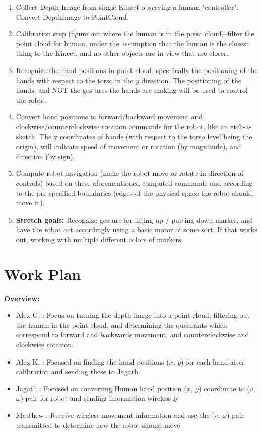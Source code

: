 \documentclass[a4paper]{article}
\begin{document}
\begin{enumerate}
\item Collect Depth Image from single Kinect observing a human "controller". Convert DepthImage to PointCloud.

\item Calibration step (figure out where the human is in the point cloud)--filter the point cloud for human, under the assumption that the human is the closest thing to the Kinect, and no other objects are in view that are closer.

\item Recognize the hand positions in point cloud, specifically the positioning of the hands with respect to the torso in the $y$ direction. The positioning of the hands, and NOT the gestures the hands are making will be used to control the robot.

\item Convert hand positions to forward/backward movement and clockwise/counterclockwise rotation commands for the robot, like an etch-a-sketch. The y coordinates of hands (with respect to the torso level being the origin), will indicate speed of movement or rotation (by magnitude), and direction (by sign).

\item Compute robot navigation (make the robot move or rotate in direction of controls) based on these aforementioned computed commands and according to the pre-specified boundaries (edges of the physical space the robot should move in).

\item \textbf{Stretch goals:} Recognize gesture for lifting up / putting down marker, and have the robot act accordingly using a basic motor of some sort. If that works out, working with multiple different colors of markers
\end{enumerate}

\newpage
\section{Work Plan}

\textbf{Overview:}
\begin{itemize}
\item Alex G. : Focus on turning the depth image into a point cloud, filtering out the human in the point cloud, and determining the quadrants which correspond to forward and backwards movement, and counterclockwise and clockwise rotation.
\item Alex K. : Focused on finding the hand positions ($x$, $y$) for each hand after calibration and sending these to Jagath.
\item Jagath : Focused on converting Human hand position ($x$, $y$) coordinate to ($v$, $\omega$) pair for robot and sending information wireless-ly
\item Matthew : Receive wireless movement information and use the ($v$, $\omega$) pair transmitted to determine how the robot should move
\end{itemize}
\end{document}
